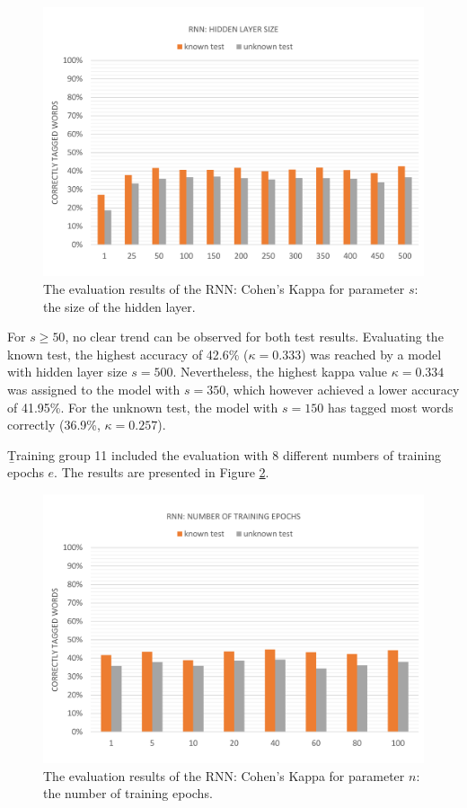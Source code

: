 \begin{figure}[H]
	\hspace{-5mm}\includegraphics[width=1.07\textwidth]{images/evaluation_rnn_s}
	\caption[RNN Evaluation: Hidden Layer Size]{The evaluation results of the RNN: Cohen's Kappa for parameter $s$: the size of the hidden layer.}
	\label{f.evaluation.rnn.s}
\end{figure}

For $s\geq50$, no clear trend can be observed for both test results. Evaluating the known test, the highest accuracy of 42.6\% ($\kappa=0.333$) was reached by a model with hidden layer size $s=500$. Nevertheless, the highest kappa value $\kappa=0.334$ was assigned to the model with $s=350$, which however achieved a lower accuracy of 41.95\%. For the unknown test, the model with $s=150$ has tagged most words correctly (36.9\%, $\kappa=0.257$).

\b{Training group 11} included the evaluation with 8 different numbers of training epochs $e$. The results are presented in Figure \ref{f.evaluation.rnn.n}.

\begin{figure}[H]
	\hspace{-5mm}\includegraphics[width=1.07\textwidth]{images/evaluation_rnn_n}
	\caption[RNN Evaluation: Number of Training Epochs]{The evaluation results of the RNN: Cohen's Kappa for parameter $n$: the number of training epochs.}
	\label{f.evaluation.rnn.n}
\end{figure}

